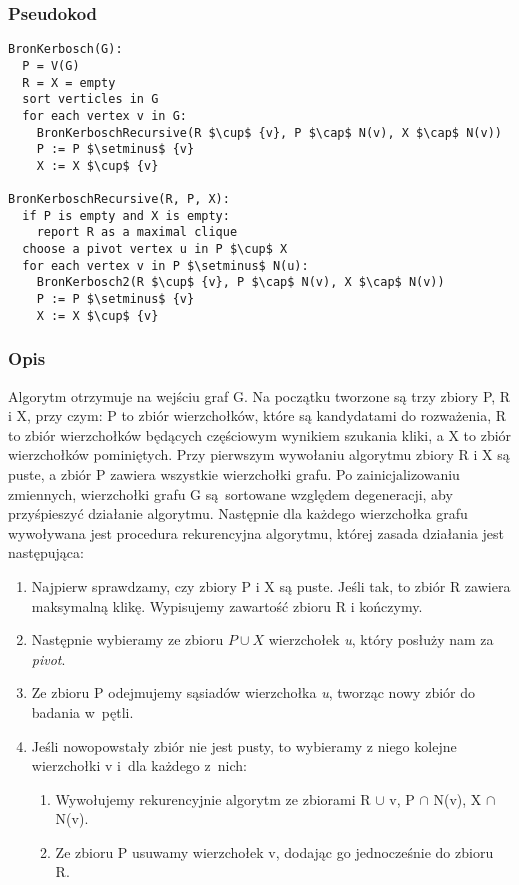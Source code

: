 \documentclass[11pt,a4paper]{article}
\begin{document}
\subsubsection{Pseudokod}
\begin{lstlisting}[mathescape = true, caption = Pseudokod algorytmu Brona-Kerboscha]
BronKerbosch(G):
  P = V(G)
  R = X = empty
  sort verticles in G
  for each vertex v in G:
    BronKerboschRecursive(R $\cup$ {v}, P $\cap$ N(v), X $\cap$ N(v))
    P := P $\setminus$ {v}
    X := X $\cup$ {v}

BronKerboschRecursive(R, P, X):
  if P is empty and X is empty:
    report R as a maximal clique
  choose a pivot vertex u in P $\cup$ X
  for each vertex v in P $\setminus$ N(u):
    BronKerbosch2(R $\cup$ {v}, P $\cap$ N(v), X $\cap$ N(v))
    P := P $\setminus$ {v}
    X := X $\cup$ {v}
\end{lstlisting}

\subsubsection{Opis}
Algorytm otrzymuje na wejściu graf G. Na początku tworzone są trzy zbiory P, R i X, przy czym: P to zbiór wierzchołków, które są kandydatami do rozważenia, R to zbiór wierzchołków będących częściowym wynikiem szukania kliki, a X to zbiór wierzchołków pominiętych. Przy pierwszym wywołaniu algorytmu zbiory R i X są puste, a zbiór P zawiera wszystkie wierzchołki grafu. Po zainicjalizowaniu zmiennych, wierzchołki grafu G są sortowane względem degeneracji, aby przyśpieszyć działanie algorytmu. Następnie dla każdego wierzchołka grafu wywoływana jest procedura rekurencyjna algorytmu, której zasada działania jest następująca:

\begin{enumerate}
  \item Najpierw sprawdzamy, czy zbiory P i X są puste. Jeśli tak, to zbiór R zawiera maksymalną klikę. Wypisujemy zawartość zbioru R i kończymy.
  \item Następnie wybieramy ze zbioru $P \cup X$ wierzchołek \textit{u}, który posłuży nam za \textit{pivot}.
  \item Ze zbioru P odejmujemy sąsiadów wierzchołka \textit{u}, tworząc nowy zbiór do badania w~pętli.
  \item Jeśli nowopowstały zbiór nie jest pusty, to wybieramy z niego kolejne wierzchołki v i~dla każdego z~nich:
    \begin{enumerate}
      \item Wywołujemy rekurencyjnie algorytm ze zbiorami R $\cup$ {v}, P $\cap$ N(v), X $\cap$ N(v).
      \item Ze zbioru P usuwamy wierzchołek v, dodając go jednocześnie do zbioru R.
    \end{enumerate}
\end{enumerate}
\end{document}
